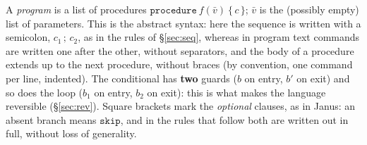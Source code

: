 \noindent
A \emph{program} is a list of procedures
$\mathtt{procedure}\ f(\bar v)\ \{\, c \,\}$; $\bar v$ is the (possibly
empty) list of parameters. This is the abstract syntax: here the sequence is written
with a semicolon, $c_1\,;\,c_2$, as in the rules of \S\ref{sec:seq},
whereas in program text commands are written one after the other, without
separators, and the body of a procedure extends up to the next procedure,
without braces (by convention, one command per line, indented). The conditional has
\textbf{two} guards ($b$ on entry, $b'$ on exit) and so does the loop ($b_1$
on entry, $b_2$ on exit): this is what makes the language reversible
(\S\ref{sec:rev}). Square brackets mark the \emph{optional} clauses,
as in Janus: an absent branch means $\mathtt{skip}$, and in the rules that follow
both are written out in full, without loss of generality.

